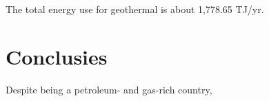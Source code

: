 \documentclass[a0,portrait]{a0poster}
\begin{document}
\begin{multicols}{3}
The total energy use for geothermal is about 1,778.65 TJ/yr.






\color{SaddleBrown} %

\section*{Conclusies}
Despite being a petroleum- and gas-rich country, 
\color{Black} %







\end{multicols}
\end{document}
